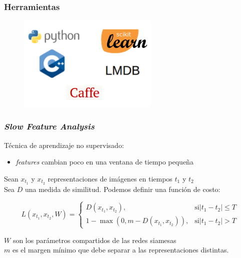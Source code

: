 \documentclass{beamer}
\begin{document}
\begin{frame}
\frametitle{Herramientas}
\begin{figure}
    \centering
    \includegraphics[width=0.6\textwidth]{images/tools.png}
\end{figure}
\end{frame}





\begin{frame}
\frametitle{\textit{Slow Feature Analysis}}

Técnica de aprendizaje no supervisado:
\begin{itemize}
    \item \textit{features} cambian poco en una ventana de tiempo pequeña \pause
	\end{itemize}

	Sean \(x_{t_1}\) y \(x_{t_2}\) representaciones de imágenes en tiempos \(t_1\) y \(t_2\)\\
Sea \(D\) una medida de similitud. Podemos definir una función de costo:

\begin{equation}
L(x_{t_1}, x_{t_2}, W) = \begin{cases}
                           D(x_{t_1}, x_{t_2}),& \text{si} |t_1 - t_2| \leq T \\ 
                           1 - \max{(0, m - D(x_{t_1}, x_{t_2}))},& \text{si} |t_1 - t_2| > T
                         \end{cases}
\end{equation}

\(W\) son los parámetros compartidos de las redes siamesas\\
\(m\) es el margen mínimo que debe separar a las representaciones distintas.
\end{frame}
\end{document}
